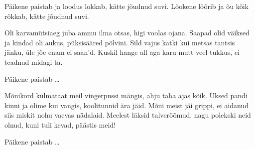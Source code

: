 
P\"aikene paistab ja loodus lokkab,
k\"atte j\~oudnud suvi.
L\~ookene l\~o\~orib ja \~ou k\~oik r\~okkab,
k\"atte j\~oudnud suvi.

Oli karvam\"utsiaeg juba ammu ilma otsas,
higi voolas ojana.
Saapad olid v\"aiksed ja kindad oli aukus,
p\"uksis\"a\"ared p\~olvini.
Sild vajus katki kui metsas tantsis j\"anku,
\"ule j\~oe enam ei saan'd.
Kuskil hange all aga karu mutt veel tukkus,
ei teadnud midagi ta.

P\"aikene paistab \ldots

M\~onikord k\"ulmataat meil vingerpussi m\"angis,
ahju taha ajas k\~oik.
Uksed pandi kinni ja olime kui vangis,
koolitunnid \"ara j\"aid.
M\~oni meist j\"ai grippi, ei aidanud siis miskit
nohu vaevas n\"adalaid.
Meelest l\"aksid talver\~o\~omud,
nagu polekski neid olnud,
kuni tuli kevad, p\"a\"astis meid!

P\"aikene paistab \ldots